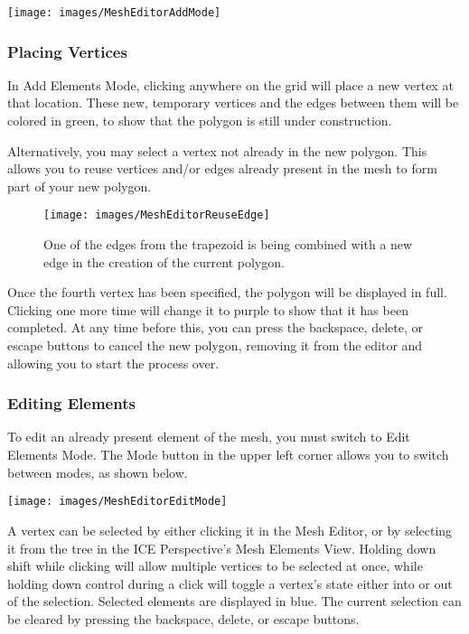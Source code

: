 \begin{center}
\texttt{[image: images/MeshEditorAddMode]}
\end{center}

\subsubsection{Placing Vertices}

In Add Elements Mode, clicking anywhere on the grid will place a new vertex at
that location. These new, temporary vertices and the edges between them will be
colored in green, to show that the polygon is still under construction.

Alternatively, you may select a vertex not already in the new polygon. This
allows you to reuse vertices and/or edges already present in the mesh to form
part of your new polygon.

\begin{figure}
\begin{center}
\texttt{[image: images/MeshEditorReuseEdge]}
\caption{One of the edges from the trapezoid is being combined with a new edge
in the creation of the current polygon.}
\end{center}
\end{figure}

Once the fourth vertex has been specified, the polygon will be displayed
in full. Clicking one more time will change it to purple to show that it has
been completed. At any time before this, you can press the backspace, delete,
or escape buttons to cancel the new polygon, removing it from the editor and
allowing you to start the process over.

\subsubsection{Editing Elements}

To edit an already present element of the mesh, you must switch to Edit Elements
Mode. The Mode button in the upper left corner allows you to switch between
modes, as shown below.

\begin{center}
\texttt{[image: images/MeshEditorEditMode]}
\end{center}

A vertex can be selected by either clicking it in the Mesh Editor, or by
selecting it from the tree in the ICE Perspective's Mesh Elements View. Holding
down shift while clicking will allow multiple vertices to be selected at once,
while holding down control during a click will toggle a vertex's state either
into or out of the selection. Selected elements are displayed in blue.
The current selection can be cleared by pressing the backspace, delete, or
escape buttons.

